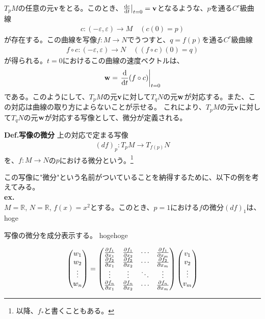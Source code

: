 \documentclass[a4paper,11pt]{jsarticle}
\numberwithin{equation}{section}
\begin{document}
$T_pM$の任意の元$\vb{v}$をとる。このとき、$\left.\dv{c}{t}\right|_{t=0} = \vb{v}$となるような、$p$を通る$C^r$級曲線
\begin{align}
    c: (-\varepsilon, \varepsilon) \to M \quad (c(0) = p)
\end{align}
が存在する。この曲線を写像$f: M \to N$でうつすと、$q = f(p)$を通る$C^r$級曲線
\begin{align}
    f \circ c: (-\varepsilon, \varepsilon) \to N \quad ((f \circ c)(0) = q)
\end{align}
が得られる。$t=0$におけるこの曲線の速度ベクトルは、
\begin{align}
    \vb{w} = \left.\dv{t} (f \circ c)\right|_{t=0}
\end{align}
である。このようにして、$T_pM$の元$\vb{v}$に対して$T_qN$の元$\vb{w}$が対応する。また、この対応は曲線の取り方によらないことが示せる。
これにより、$T_pM$の元$\vb{v}$に対して$T_qN$の元$\vb{w}$が対応する写像として、微分が定義される。

\begin{itembox}[l]{\textbf{Def.写像の微分}}
  上の対応で定まる写像
  \begin{align}
    (df)_p: T_pM \to T_{f(p)}N
  \end{align}
  を、$f: M \to N$の$p$における微分という。\footnote{以降、$f_*$と書くこともある。}
\end{itembox}
この写像に"微分"という名前がついていることを納得するために、以下の例を考えてみる。\\
\textbf{ex.}\\
$M = \mathbb{R}$, $N = \mathbb{R}$, $f(x) = x^2$とする。このとき、$p = 1$における$f$の微分$(df)_1$は、
hoge

写像の微分を成分表示する。
hogehoge

\begin{align}
  \begin{pmatrix}
    w_1 \\
    w_2 \\
    \vdots \\
    w_n
  \end{pmatrix}
  =
  \begin{pmatrix}
    \pdv{f_1}{x_1}(p) & \pdv{f_1}{x_2}(p) & \cdots & \pdv{f_1}{x_m}(p) \\
    \pdv{f_2}{x_1}(p) & \pdv{f_2}{x_2}(p) & \cdots & \pdv{f_2}{x_m}(p) \\
    \vdots & \vdots & \ddots & \vdots \\
    \pdv{f_n}{x_1}(p) & \pdv{f_n}{x_2}(p) & \cdots & \pdv{f_n}{x_m}(p)
  \end{pmatrix}
  \begin{pmatrix}
    v_1 \\
    v_2 \\
    \vdots \\
    v_m
  \end{pmatrix}
\end{align}
\end{document}

